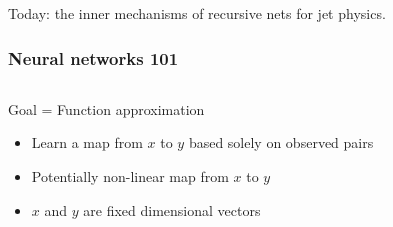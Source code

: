 \documentclass{beamer}
\begin{document}
\begin{frame}
    \vspace{0.5cm}

    Today: the inner mechanisms of recursive nets for jet physics.


\end{frame}

\begin{frame}
    \frametitle{Neural networks 101}

    \begin{columns}
        \begin{column}{0.65\textwidth}
                Goal = Function approximation
                \begin{itemize}
                    \item Learn a map from $x$ to $y$ based solely on observed pairs
                    \item Potentially non-linear map from $x$ to $y$
                    \item $x$ and $y$ are {\color{blue} fixed dimensional vectors}
                \end{itemize}

                \vspace{0.5cm}


\end{column}
\end{columns}
\end{frame}
\end{document}
